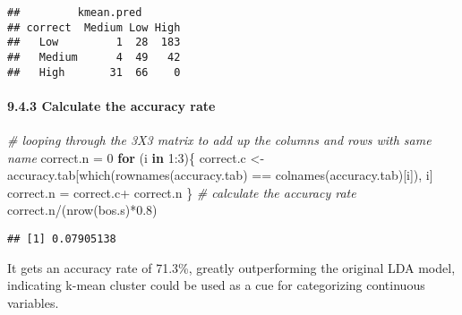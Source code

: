 \documentclass[
]{article}
\newenvironment{Shaded}{\begin{snugshade}}{\end{snugshade}}
\newcommand{\CommentTok}[1]{\textcolor[rgb]{0.56,0.35,0.01}{\textit{#1}}}
\newcommand{\ControlFlowTok}[1]{\textcolor[rgb]{0.13,0.29,0.53}{\textbf{#1}}}
\newcommand{\DecValTok}[1]{\textcolor[rgb]{0.00,0.00,0.81}{#1}}
\newcommand{\FloatTok}[1]{\textcolor[rgb]{0.00,0.00,0.81}{#1}}
\newcommand{\FunctionTok}[1]{\textcolor[rgb]{0.00,0.00,0.00}{#1}}
\newcommand{\NormalTok}[1]{#1}
\newcommand{\OtherTok}[1]{\textcolor[rgb]{0.56,0.35,0.01}{#1}}
\newcommand{\SpecialCharTok}[1]{\textcolor[rgb]{0.00,0.00,0.00}{#1}}
\begin{document}
\begin{verbatim}
##         kmean.pred
## correct  Medium Low High
##   Low         1  28  183
##   Medium      4  49   42
##   High       31  66    0
\end{verbatim}

\hypertarget{calculate-the-accuracy-rate}{%
\paragraph{9.4.3 Calculate the accuracy
rate}\label{calculate-the-accuracy-rate}}

\begin{Shaded}
\begin{Highlighting}[]
\CommentTok{\# looping through the 3X3 matrix to add up the columns and rows with same name}
\NormalTok{correct.n }\OtherTok{=} \DecValTok{0}
\ControlFlowTok{for}\NormalTok{ (i }\ControlFlowTok{in} \DecValTok{1}\SpecialCharTok{:}\DecValTok{3}\NormalTok{)\{}
\NormalTok{  correct.c }\OtherTok{\textless{}{-}}\NormalTok{ accuracy.tab[}\FunctionTok{which}\NormalTok{(}\FunctionTok{rownames}\NormalTok{(accuracy.tab) }\SpecialCharTok{==} \FunctionTok{colnames}\NormalTok{(accuracy.tab)[i]), i]}
\NormalTok{  correct.n }\OtherTok{=}\NormalTok{ correct.c}\SpecialCharTok{+}\NormalTok{ correct.n}
\NormalTok{\} }
\CommentTok{\# calculate the accuracy rate}
\NormalTok{correct.n}\SpecialCharTok{/}\NormalTok{(}\FunctionTok{nrow}\NormalTok{(bos.s)}\SpecialCharTok{*}\FloatTok{0.8}\NormalTok{)}
\end{Highlighting}
\end{Shaded}

\begin{verbatim}
## [1] 0.07905138
\end{verbatim}

It gets an accuracy rate of 71.3\%, greatly outperforming the original
LDA model, indicating k-mean cluster could be used as a cue for
categorizing continuous variables.
\end{document}
